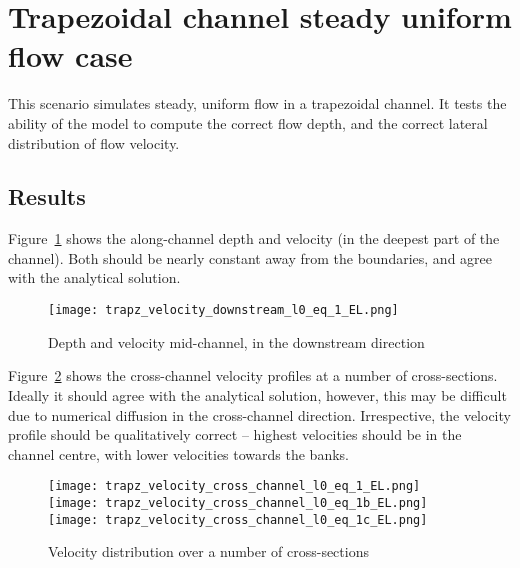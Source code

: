 \section{Trapezoidal channel steady uniform flow case}
This scenario simulates steady, uniform flow in a trapezoidal channel. It tests the ability of the model to compute the correct flow depth, and the correct lateral distribution of flow velocity.

\subsection{Results}
Figure~\ref{downstream_depth} shows the along-channel depth and velocity (in the deepest part of the channel). Both should be nearly constant away from the boundaries, and agree with the analytical solution. 

\begin{figure}[h]
\begin{center}
\texttt{[image: trapz\_velocity\_downstream\_l0\_eq\_1\_EL.png]}
\caption{Depth and velocity mid-channel, in the downstream direction}
\label{downstream_depth}
\end{center}
\end{figure}

Figure~\ref{xsect_vels} shows the cross-channel velocity profiles at a number of cross-sections. Ideally it should agree with the analytical solution, however, this may be difficult due to numerical diffusion in the cross-channel direction. Irrespective, the velocity profile should be qualitatively correct -- highest velocities should be in the channel centre, with lower velocities towards the banks.

\begin{figure}[h]
\begin{center}
\texttt{[image: trapz\_velocity\_cross\_channel\_l0\_eq\_1\_EL.png]}
\texttt{[image: trapz\_velocity\_cross\_channel\_l0\_eq\_1b\_EL.png]}
\texttt{[image: trapz\_velocity\_cross\_channel\_l0\_eq\_1c\_EL.png]}
\caption{Velocity distribution over a number of cross-sections}
\label{xsect_vels}
\end{center}
\end{figure}

\endinput
